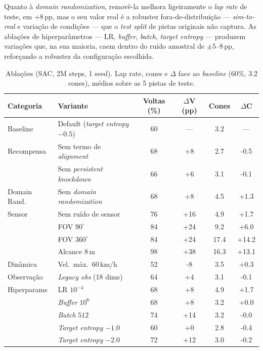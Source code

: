 \documentclass[runningheads]{llncs}
\begin{document}
Quanto à \textit{domain randomization}, removê-la melhora ligeiramente o \textit{lap rate} de teste, em +8\,pp, mas o seu valor real é a robustez fora-de-distribuição --- \textit{sim-to-real} e variação de condições --- que o \textit{test split} de pistas originais não captura. As ablações de hiperparâmetros --- LR, \textit{buffer}, \textit{batch}, \textit{target entropy} --- produzem variações que, na sua maioria, caem dentro do ruído amostral de $\pm5$--$8$\,pp, reforçando a robustez da configuração escolhida.

\begin{table}[t]
\centering
\caption{Ablações (SAC, 2M steps, 1 seed). Lap rate, cones e $\Delta$ face ao \textit{baseline} (60\%, 3.2 cones), médios sobre as 5 pistas de teste.}
\label{tab:ablations}
\small
\begin{tabular}{llcccc}
\toprule
\textbf{Categoria} & \textbf{Variante} & \textbf{Voltas (\%)} & \textbf{$\Delta$V (pp)} & \textbf{Cones} & \textbf{$\Delta$C} \\
\midrule
\addlinespace[2pt]
Baseline & Default (\textit{target entropy} $-0.5$) & 60 & --- & 3.2 & --- \\
\addlinespace[2pt]
Recompensa & Sem termo de \textit{alignment} & 68 & +8 & 2.7 & -0.5 \\
 & Sem \textit{persistent knockdown} & 66 & +6 & 3.1 & -0.1 \\
\addlinespace[2pt]
Domain Rand. & Sem \textit{domain randomization} & 68 & +8 & 4.5 & +1.3 \\
\addlinespace[2pt]
Sensor & Sem ruído de sensor & 76 & +16 & 4.9 & +1.7 \\
 & FOV $90^\circ$ & 84 & +24 & 9.2 & +6.0 \\
 & FOV $360^\circ$ & 84 & +24 & 17.4 & +14.2 \\
 & Alcance $8$\,m & 98 & +38 & 16.3 & +13.1 \\
\addlinespace[2pt]
Dinâmica & Vel.\ máx.\ $60$\,km/h & 52 & -8 & 3.5 & +0.3 \\
\addlinespace[2pt]
Observação & \textit{Legacy obs} (18 dims) & 64 & +4 & 3.1 & -0.1 \\
\addlinespace[2pt]
Hiperparams & LR $10^{-4}$ & 68 & +8 & 4.9 & +1.7 \\
 & \textit{Buffer} $10^6$ & 68 & +8 & 3.2 & +0.0 \\
 & \textit{Batch} $512$ & 74 & +14 & 3.2 & -0.0 \\
 & \textit{Target entropy} $-1.0$ & 60 & +0 & 2.8 & -0.4 \\
 & \textit{Target entropy} $-2.0$ & 72 & +12 & 3.0 & -0.2 \\
\bottomrule
\end{tabular}
\end{table}
\end{document}
